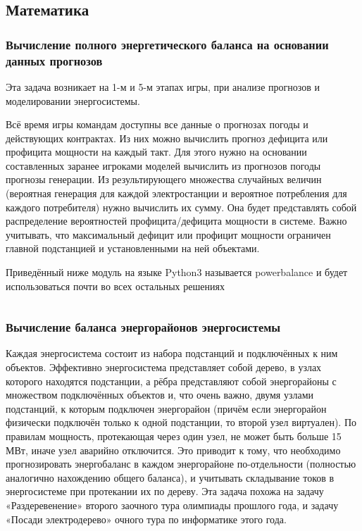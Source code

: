 \subsection*{Математика}

\subsubsection*{Вычисление полного энергетического баланса на основании данных прогнозов}

Эта задача возникает на 1-м и 5-м этапах игры, при анализе прогнозов и моделировании энергосистемы.

Всё время игры командам доступны все данные о прогнозах погоды и действующих контрактах. Из них можно вычислить прогноз дефицита или профицита мощности на каждый такт. Для этого нужно на основании составленных заранее игроками моделей вычислить из прогнозов погоды прогнозы генерации. Из результирующего множества случайных величин (вероятная генерация для каждой электростанции и вероятное потребления для каждого потребителя) нужно вычислить их сумму. Она будет представлять собой распределение вероятностей профицита/дефицита мощности в системе. Важно учитывать, что максимальный дефицит или профицит мощности ограничен главной подстанцией и установленными на ней объектами.

\solutionSection

Приведённый ниже модуль на языке Python3 называется powerbalance и будет использоваться почти во всех остальных решениях

\inputminted[fontsize=\footnotesize, linenos]{python}{final/command_tour/ies/task_01/subtask_02/source_1.py}

\subsubsection*{Вычисление баланса энергорайонов энергосистемы}

Каждая энергосистема состоит из набора подстанций и подключённых к ним объектов. Эффективно энергосистема представляет собой дерево, в узлах которого находятся подстанции, а рёбра представляют собой энергорайоны с множеством подключённых объектов и, что очень важно, двумя узлами подстанций, к которым подключен энергорайон (причём если энергорайон физически подключён только к одной подстанции, то второй узел виртуален). По правилам мощность, протекающая через один узел, не может быть больше 15 МВт, иначе узел аварийно отключится. Это приводит к тому, что необходимо прогнозировать энергобаланс в каждом энергорайоне по-отдельности (полностью аналогично нахождению общего баланса), и учитывать складывание токов в энергосистеме при протекании их по дереву. Эта задача похожа на задачу «Раздеревенение» второго заочного тура олимпиады прошлого года, и задачу «Посади электродерево» очного тура по информатике этого года.

